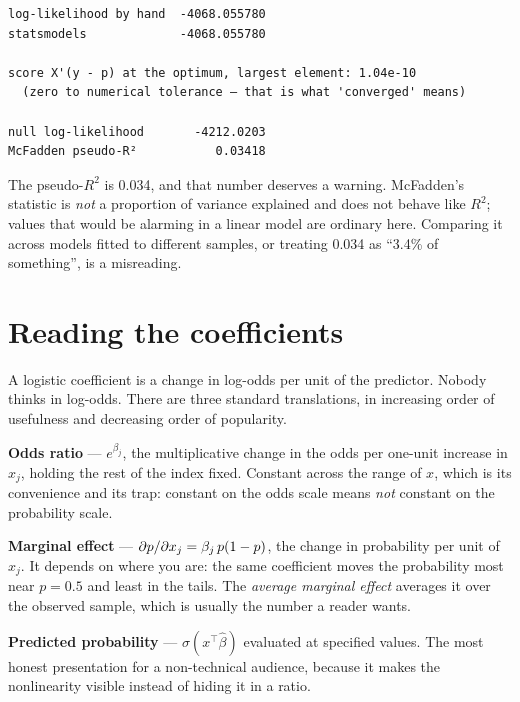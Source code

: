 \documentclass[
  letterpaper,
  10pt,
  twoside,
  openright,
  numbers=noenddot,
  chapterprefix=true]{scrbook}
\begin{document}
\begin{verbatim}
log-likelihood by hand  -4068.055780
statsmodels             -4068.055780

score X'(y - p) at the optimum, largest element: 1.04e-10
  (zero to numerical tolerance — that is what 'converged' means)

null log-likelihood       -4212.0203
McFadden pseudo-R²           0.03418
\end{verbatim}

The pseudo-\(R^2\) is 0.034, and that number deserves a warning.
McFadden's statistic is \emph{not} a proportion of variance explained
and does not behave like \(R^2\); values that would be alarming in a
linear model are ordinary here. Comparing it across models fitted to
different samples, or treating 0.034 as ``3.4\% of something'', is a
misreading.

\section{Reading the coefficients}\label{reading-the-coefficients}

A logistic coefficient is a change in log-odds per unit of the
predictor. Nobody thinks in log-odds. There are three standard
translations, in increasing order of usefulness and decreasing order of
popularity.

\begin{qmibdefinition}

{\textbf{Odds ratio}} --- \(e^{\beta_j}\), the multiplicative change in
the odds per one-unit increase in \(x_j\), holding the rest of the index
fixed. Constant across the range of \(x\), which is its convenience and
its trap: constant on the odds scale means \emph{not} constant on the
probability scale.

\end{qmibdefinition}

\begin{qmibdefinition}

{\textbf{Marginal effect}} ---
\(\partial p / \partial x_j = \beta_j\thinspace p(1-p)\), the change in
probability per unit of \(x_j\). It depends on where you are: the same
coefficient moves the probability most near \(p = 0.5\) and least in the
tails. The \emph{average marginal effect} averages it over the observed
sample, which is usually the number a reader wants.

\end{qmibdefinition}

\begin{qmibdefinition}

{\textbf{Predicted probability}} --- \(\sigma(x^\top\hat\beta)\)
evaluated at specified values. The most honest presentation for a
non-technical audience, because it makes the nonlinearity visible
instead of hiding it in a ratio.

\end{qmibdefinition}
\end{document}
